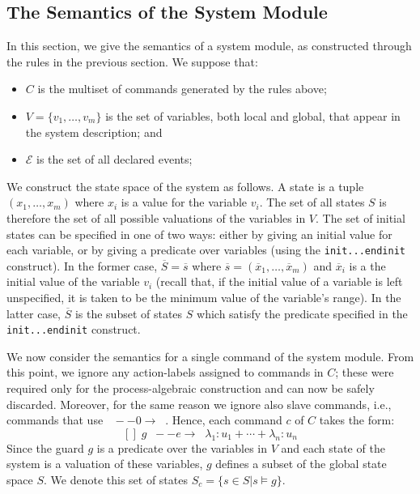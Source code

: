 \documentclass{article}
\newcommand{\arc}[1]{\;\;--{#1}\longrightarrow \;\;}
\newcommand{\calE}{\mathcal{E}}
\newcommand{\events}{{\calE}}
\newcommand{\code}[1]{\texttt{#1}}
\begin{document}
\subsection*{The Semantics of the System Module}
In this section, we give the semantics of a system module, as constructed through the rules
in the previous section. 
We suppose that:
\begin{itemize}
	\item $C$ is the multiset of commands generated by the rules above;
	\item $V = \{v_1, \ldots , v_m\}$ is the set of variables, both local and global, that appear in the system description; and
	\item $\events$ is the set of all declared events;
\end{itemize}

We construct the state space of the system as follows. 
A state is a tuple $(x_1, \ldots , x_m)$ where $x_i$ is a value for the variable $v_i$. 
The set of all states $S$ is therefore the set of all possible valuations of the variables in $V$. 
The set of initial states can be specified in one of two ways: either by giving an initial value for each variable, or by giving a predicate over variables (using the \code{init...endinit} construct). 
In the former case, $\overline{S} = \overline{s}$ where $\overline{s} = (\overline{x}_1, \ldots , \overline{x}_m)$ and $\overline{x}_i$ is a the initial value of the variable $v_i$ (recall that, if the initial value of a variable is left unspecified, it is taken to be the minimum value of the variable’s range). 
In the latter case, $\overline{S}$ is the subset of states $S$ which satisfy the
predicate specified in the \code{init...endinit} construct.

We now consider the semantics for a single command of the system module. 
From this point, we ignore any action-labels assigned to commands in $C$; these were required only for the process-algebraic construction and can now be safely discarded.
Moreover, for the same reason we ignore also slave commands, i.e., commands that use $\arc{0}$. 
Hence, each command $c$ of $C$ takes the form:
$$[] \; g \arc{e}   \lambda_1 : u_1 + \cdots + \lambda_n : u_n$$
%
Since the guard $g$ is a predicate over the variables in $V$ and each state of the system is a valuation of these variables, $g$ defines a subset of the global state space $S$. 
We denote this set of states $S_c = \{s \in S | s \models g\}$.
\end{document}
